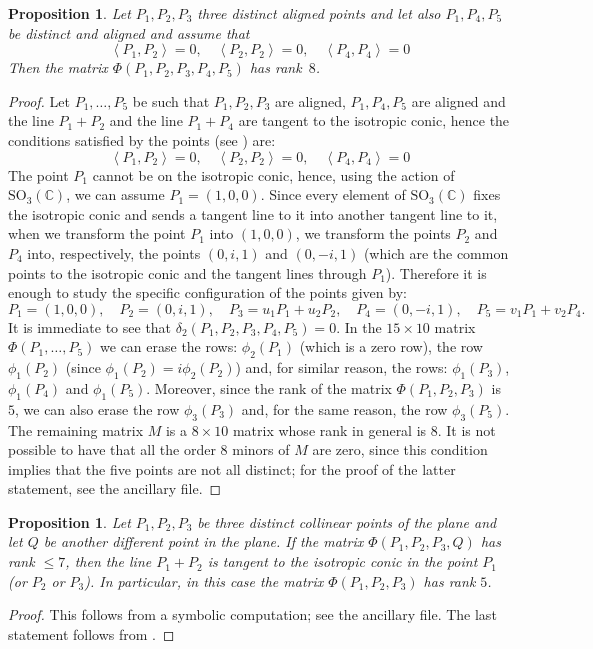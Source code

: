 \documentclass[12pt, a4paper, reqno, captions=tableheading,bibliography=totoc]{scrartcl}
\theoremstyle{plain}
\newtheorem{prop}[lemma]{Proposition}
\theoremstyle{definition}
\newcommand{\scl}[2]{\left\langle {#1}, {#2} \right\rangle}
\begin{document}
\begin{prop}
Let $P_1, P_2, P_3$ three distinct aligned points and let also $P_1, P_4, P_5$
be distinct and aligned and assume that
\[
\scl{P_1}{P_2}=0, \quad \scl{P_2}{P_2}=0, \quad \scl{P_4}{P_4}=0
\]
Then the matrix $\Phi(P_1, P_2, P_3, P_4, P_5)$ has rank~$8$.
\label{prop:frecciaFissata}
\end{prop}
\begin{proof}
Let $P_1, \dots, P_5$ be such that $P_1, P_2, P_3$ are aligned,
$P_1, P_4, P_5$ are aligned and the line $P_1+P_2$ and the line
$P_1+P_4$ are tangent to the isotropic conic, hence
the conditions satisfied by the points (see ) are:
\[
\scl{P_1}{P_2}=0, \quad \scl{P_2}{P_2}=0, \quad \scl{P_4}{P_4}=0
\]
The point $P_1$ cannot be on the isotropic conic, hence, using the
action of $\mathrm{SO}_3(\mathbb{C})$, we can assume $P_1 = (1, 0, 0)$.
Since every element of $\mathrm{SO}_3(\mathbb{C})$ fixes the
isotropic conic and sends a tangent line to it into another
tangent line to it, when we transform the point $P_1$
into $(1, 0, 0)$, we transform the points $P_2$ and $P_4$ into, respectively,
the points $(0, i, 1)$ and $(0, -i, 1)$ (which are the common points to
the isotropic conic and the tangent lines through $P_1$).
Therefore it is enough to study the
specific configuration of the points given by:
\[
P_1 = (1, 0, 0), \quad P_2=(0, i, 1), \quad P_3=u_1P_1+u_2P_2, \quad
P_4= (0, -i, 1), \quad P_5 = v_1P_1+v_2P_4.
\]
It is immediate to see that $\delta_2(P_1, P_2, P_3, P_4, P_5) = 0$.
In the $15\times 10$ matrix $\Phi(P_1, \dots, P_5)$ we can erase the
rows: $\phi_2(P_1)$ (which is a zero row), the row $\phi_1(P_2)$
(since $\phi_1(P_2)=i\phi_2(P_2)$) and, for similar reason, the
rows: $\phi_1(P_3)$, $\phi_1(P_4)$ and $\phi_1(P_5)$.
Moreover, since the rank of the matrix $\Phi(P_1, P_2, P_3)$ is $5$,
we can also erase the row $\phi_3(P_3)$ and, for the same reason, the
row $\phi_3(P_5)$. The remaining matrix $M$ is a $8\times 10$ matrix whose rank
in general is $8$. It is not possible to have that all the order $8$ minors
of $M$ are zero, since this condition implies that the five points
are not all distinct; for the proof of the latter statement, see the ancillary file.
\end{proof}

\begin{prop}
\label{prop:condition3+1}
  Let $P_1, P_2, P_3$ be three distinct collinear points of the
  plane and let $Q$ be another different point in the plane.
  If the matrix $\Phi(P_1, P_2, P_3, Q)$ has rank $\leq 7$,
  then the line $P_1+P_2$ is tangent to the isotropic conic in the point
  $P_1$ (or $P_2$ or $P_3$).
  In particular, in this case the matrix $\Phi(P_1, P_2, P_3)$
  has rank $5$.
\end{prop}
\begin{proof}
 This follows from a symbolic computation; see the ancillary file.
 The last statement follows from .
\end{proof}
\end{document}
